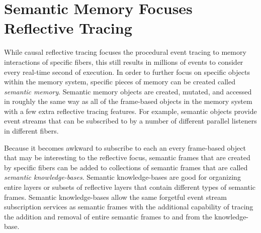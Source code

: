 \section{Semantic Memory Focuses Reflective Tracing}

While causal reflective tracing focuses the procedural event tracing
to memory interactions of specific fibers, this still results in
millions of events to consider every real-time second of execution.
In order to further focus on specific objects within the memory
system, specific pieces of memory can be created called \emph{semantic
  memory}.  Semantic memory objects are created, mutated, and accessed
in roughly the same way as all of the frame-based objects in the
memory system with a few extra reflective tracing features.  For
example, semantic objects provide event streams that can be subscribed
to by a number of different parallel listeners in different fibers.

Because it becomes awkward to subscribe to each an every frame-based
object that may be interesting to the reflective focus, semantic
frames that are created by specific fibers can be added to collections
of semantic frames that are called \emph{semantic knowledge-bases}.
Semantic knowledge-bases are good for organizing entire layers or
subsets of reflective layers that contain different types of semantic
frames.  Semantic knowledge-bases allow the same forgetful event
stream subscription services as semantic frames with the additional
capability of tracing the addition and removal of entire semantic
frames to and from the knowledge-base.

